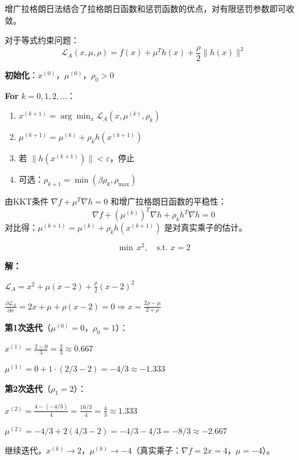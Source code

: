 增广拉格朗日法结合了拉格朗日函数和惩罚函数的优点，对有限惩罚参数即可收敛。

\begin{definition}[增广拉格朗日函数]
对于等式约束问题：
\[
\mathcal{L}_A(x, \mu, \rho) = f(x) + \mu^T h(x) + \frac{\rho}{2}\|h(x)\|^2
\]
\end{definition}

\begin{algobox}[增广拉格朗日法]
\textbf{初始化}：$x^{(0)}$，$\mu^{(0)}$，$\rho_0 > 0$

\textbf{For} $k = 0, 1, 2, \ldots$：
\begin{enumerate}
    \item $x^{(k+1)} = \arg\min_x \mathcal{L}_A(x, \mu^{(k)}, \rho_k)$
    \item $\mu^{(k+1)} = \mu^{(k)} + \rho_k h(x^{(k+1)})$
    \item 若 $\|h(x^{(k+1)})\| < \varepsilon$，停止
    \item 可选：$\rho_{k+1} = \min(\beta \rho_k, \rho_{\max})$
\end{enumerate}
\end{algobox}

\begin{notebox}[乘子更新原理]
由KKT条件 $\nabla f + \mu^T \nabla h = 0$ 和增广拉格朗日函数的平稳性：
\[
\nabla f + (\mu^{(k)})^T \nabla h + \rho_k h^T \nabla h = 0
\]
对比得：$\mu^{(k+1)} = \mu^{(k)} + \rho_k h(x^{(k+1)})$ 是对真实乘子的估计。
\end{notebox}

\begin{example}
\[
\min \, x^2, \quad \text{s.t. } x = 2
\]

\textbf{解：}

$\mathcal{L}_A = x^2 + \mu(x-2) + \frac{\rho}{2}(x-2)^2$

$\frac{\partial \mathcal{L}_A}{\partial x} = 2x + \mu + \rho(x-2) = 0 \Rightarrow x = \frac{2\rho - \mu}{2 + \rho}$

\textbf{第1次迭代}（$\mu^{(0)} = 0$，$\rho_0 = 1$）：

$x^{(1)} = \frac{2 - 0}{3} = \frac{2}{3} \approx 0.667$

$\mu^{(1)} = 0 + 1 \cdot (2/3 - 2) = -4/3 \approx -1.333$

\textbf{第2次迭代}（$\rho_1 = 2$）：

$x^{(2)} = \frac{4 - (-4/3)}{4} = \frac{16/3}{4} = \frac{4}{3} \approx 1.333$

$\mu^{(2)} = -4/3 + 2(4/3 - 2) = -4/3 - 4/3 = -8/3 \approx -2.667$

继续迭代，$x^{(k)} \to 2$，$\mu^{(k)} \to -4$（真实乘子：$\nabla f = 2x = 4$，$\mu = -4$）。
\end{example}

